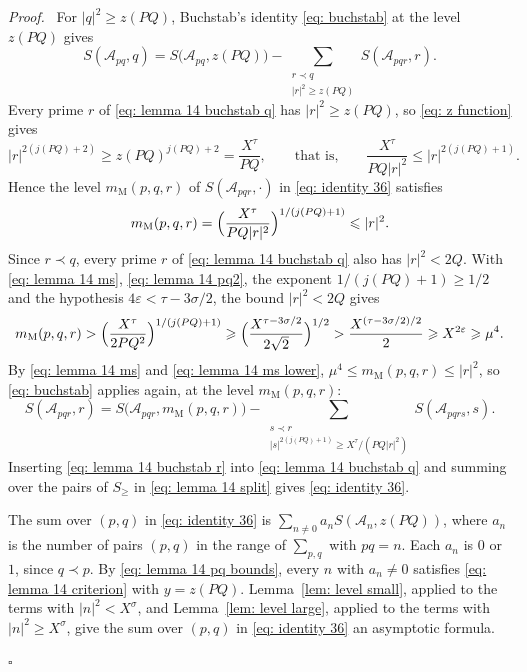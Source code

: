 \documentclass{article}
\numberwithin{equation}{section}
\newenvironment{proof}[1][Proof]{\par\medskip\noindent\textit{#1.}\ }{\hfill$\square$\par\medskip}
\newcommand{\Le}{\leqslant}
\newcommand{\Ge}{\geqslant}
\begin{document}
\begin{proof}
For $|q|^2 \Ge z(PQ)$, Buchstab's identity \eqref{eq: buchstab} at the level $z(PQ)$ gives
\begin{equation}
\label{eq: lemma 14 buchstab q}
S(\mathcal{A}_{pq}, q) = S\bigl(\mathcal{A}_{pq}, z(PQ)\bigr) - \sum_{\substack{r \prec q \\ |r|^2 \Ge z(PQ)}} S(\mathcal{A}_{pqr}, r).
\end{equation}
Every prime $r$ of \eqref{eq: lemma 14 buchstab q} has $|r|^2 \Ge z(PQ)$, so \eqref{eq: z function} gives
\begin{equation*}
|r|^{2(j(PQ)+2)} \Ge z(PQ)^{j(PQ)+2} = \frac{X^{\tau}}{PQ}, \qquad \text{that is,} \qquad \frac{X^{\tau}}{PQ|r|^2} \Le |r|^{2(j(PQ)+1)}.
\end{equation*}
Hence the level $m_{\mathrm{M}}(p, q, r)$ of $S(\mathcal{A}_{pqr}, \cdot)$ in \eqref{eq: identity 36} satisfies
\begin{equation}
\label{eq: lemma 14 ms}
m_{\mathrm{M}}(p, q, r) = \Bigl( \frac{X^{\tau}}{PQ|r|^2} \Bigr)^{1/(j(PQ)+1)} \Le |r|^2.
\end{equation}
Since $r \prec q$, every prime $r$ of \eqref{eq: lemma 14 buchstab q} also has $|r|^2 < 2Q$. With \eqref{eq: lemma 14 ms}, \eqref{eq: lemma 14 pq2}, the exponent $1/(j(PQ)+1) \Ge 1/2$ and the hypothesis $4\varepsilon < \tau - 3\sigma/2$, the bound $|r|^2 < 2Q$ gives
\begin{equation}
\label{eq: lemma 14 ms lower}
m_{\mathrm{M}}(p, q, r) > \Bigl( \frac{X^{\tau}}{2PQ^2} \Bigr)^{1/(j(PQ)+1)} \Ge \Bigl( \frac{X^{\tau - 3\sigma/2}}{2\sqrt{2}} \Bigr)^{1/2} > \frac{X^{(\tau - 3\sigma/2)/2}}{2} \Ge X^{2\varepsilon} \Ge \mu^4.
\end{equation}
By \eqref{eq: lemma 14 ms} and \eqref{eq: lemma 14 ms lower}, $\mu^4 \Le m_{\mathrm{M}}(p, q, r) \Le |r|^2$, so \eqref{eq: buchstab} applies again, at the level $m_{\mathrm{M}}(p, q, r)$:
\begin{equation}
\label{eq: lemma 14 buchstab r}
S(\mathcal{A}_{pqr}, r) = S\bigl(\mathcal{A}_{pqr}, m_{\mathrm{M}}(p, q, r)\bigr) - \sum_{\substack{s \prec r \\ |s|^{2(j(PQ)+1)} \Ge X^{\tau}/(PQ|r|^2)}} S(\mathcal{A}_{pqrs}, s).
\end{equation}
Inserting \eqref{eq: lemma 14 buchstab r} into \eqref{eq: lemma 14 buchstab q} and summing over the pairs of $S_\Ge$ in \eqref{eq: lemma 14 split} gives \eqref{eq: identity 36}.

The sum over $(p, q)$ in \eqref{eq: identity 36} is $\sum_{n \neq 0} a_n S(\mathcal{A}_n, z(PQ))$, where $a_n$ is the number of pairs $(p, q)$ in the range of $\sum_{p, q}$ with $pq = n$. Each $a_n$ is $0$ or $1$, since $q \prec p$. By \eqref{eq: lemma 14 pq bounds}, every $n$ with $a_n \neq 0$ satisfies \eqref{eq: lemma 14 criterion} with $y = z(PQ)$. Lemma~\ref{lem: level small}, applied to the terms with $|n|^2 < X^{\sigma}$, and Lemma~\ref{lem: level large}, applied to the terms with $|n|^2 \Ge X^{\sigma}$, give the sum over $(p, q)$ in \eqref{eq: identity 36} an asymptotic formula.


\end{proof}
\end{document}
